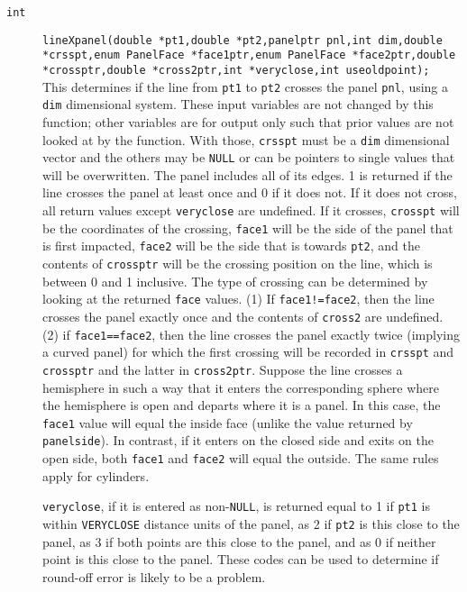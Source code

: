 \documentclass {book}
\begin{document}
\begin{description}
\item[\texttt{int}]
\texttt{lineXpanel(double *pt1,double *pt2,panelptr pnl,int dim,double *crsspt,enum PanelFace *face1ptr,enum PanelFace *face2ptr,double *crossptr,double *cross2ptr,int *veryclose,int useoldpoint);}
\hfill \\
This determines if the line from \texttt{pt1} to \texttt{pt2} crosses the panel \texttt{pnl}, using a \texttt{dim} dimensional system.  These input variables are not changed by this function; other variables are for output only such that prior values are not looked at by the function.  With those, \texttt{crsspt} must be a \texttt{dim} dimensional vector and the others may be \texttt{NULL} or can be pointers to single values that will be overwritten.  The panel includes all of its edges.  1 is returned if the line crosses the panel at least once and 0 if it does not.  If it does not cross, all return values except \texttt{veryclose} are undefined.  If it crosses, \texttt{crosspt} will be the coordinates of the crossing, \texttt{face1} will be the side of the panel that is first impacted, \texttt{face2} will be the side that is towards \texttt{pt2}, and the contents of \texttt{crossptr} will be the crossing position on the line, which is between 0 and 1 inclusive.  The type of crossing can be determined by looking at the returned \texttt{face} values.  (1) If \texttt{face1!=face2}, then the line crosses the panel exactly once and the contents of \texttt{cross2} are undefined.  (2) if \texttt{face1==face2}, then the line crosses the panel exactly twice (implying a curved panel) for which the first crossing will be recorded in \texttt{crsspt} and \texttt{crossptr} and the latter in \texttt{cross2ptr}.  Suppose the line crosses a hemisphere in such a way that it enters the corresponding sphere where the hemisphere is open and departs where it is a panel.  In this case, the \texttt{face1} value will equal the inside face (unlike the value returned by \texttt{panelside}).  In contrast, if it enters on the closed side and exits on the open side, both \texttt{face1} and \texttt{face2} will equal the outside.  The same rules apply for cylinders.

\texttt{veryclose}, if it is entered as non-\texttt{NULL}, is returned equal to 1 if \texttt{pt1} is within \texttt{VERYCLOSE} distance units of the panel, as 2 if \texttt{pt2} is this close to the panel, as 3 if both points are this close to the panel, and as 0 if neither point is this close to the panel.  These codes can be used to determine if round-off error is likely to be a problem.


\end{description}
\end{document}
